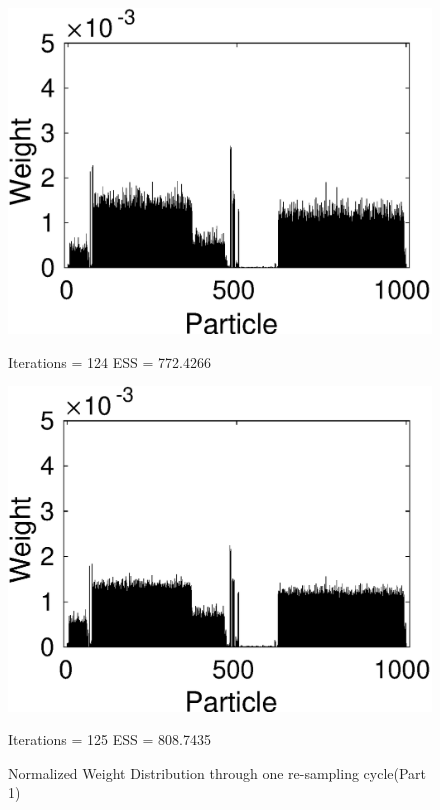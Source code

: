 \documentclass[12pt]{article}
\begin{document}
\begin{figure}[ht!]
\begin{minipage}{0.5\textwidth}
		\includegraphics[scale = 0.5]{./Figures/124.eps}
		\caption*{Iterations = 124 ESS = 772.4266}
	\end{minipage}%
	\begin{minipage}{0.5\textwidth}
		\centering
		\includegraphics[scale = 0.5]{./Figures/125.eps}
		\caption*{Iterations = 125 ESS = 808.7435}
	\end{minipage}
	\caption{Normalized Weight Distribution through one re-sampling cycle(Part 1)}
	\label{fig:DGweights1}
\end{figure}
\newpage
\end{document}
